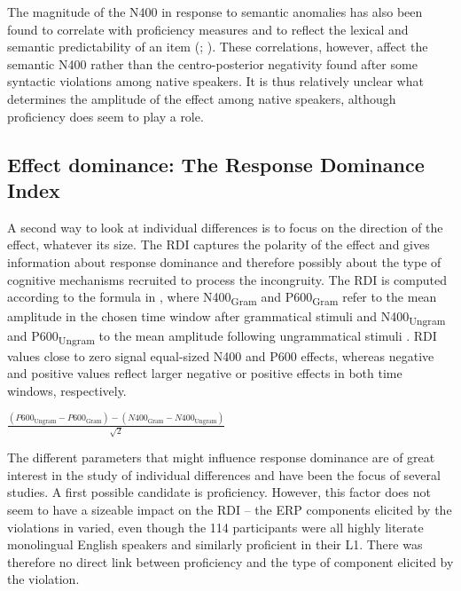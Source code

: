 \documentclass[output=paper,colorlinks,citecolor=brown,modfonts,nonflat]{../langscibook}
\begin{document}
The magnitude of the N400 in response to semantic anomalies has also been found to correlate with proficiency measures \citep{NewmanEtAl2012} and to reflect the lexical and semantic predictability of an item (\citealt{FedermeierKutas1999}; \citealt{DeLongEtAl2005,Federmeier2007}). These correlations, however, affect the semantic N400 rather than the centro-posterior negativity found after some syntactic violations among native speakers. It is thus relatively unclear what determines the amplitude of the effect among native speakers, although proficiency does seem to play a role.

\subsection{Effect dominance: The Response Dominance Index}


A second way to look at individual differences is to focus on the direction of the effect, whatever its size. The RDI captures the polarity of the effect and gives information about response dominance and therefore possibly about the type of cognitive mechanisms recruited to process the incongruity. The RDI is computed according to the formula in , where N400\textsubscript{Gram} and P600\textsubscript{Gram} refer to the mean amplitude in the chosen time window after grammatical stimuli and N400\textsubscript{Ungram} and P600\textsubscript{Ungram} to the mean amplitude following ungrammatical stimuli \citep{TannerEtAl2014}. RDI values close to zero signal equal-sized N400 and P600 effects, whereas negative and positive values reflect larger negative or positive effects in both time windows, respectively. \label{bkm:Ref4495949}

\ea
$\frac{\left(P600_{{\text{Ungram}}}-P600_{{\text{Gram}}}\right)-\left(N400_{{\text{Gram}}}-N400_{{\text{Ungram}}}\right)}{\sqrt 2}$
\z

The different parameters that might influence response dominance are of great interest in the study of individual differences and have been the focus of several studies. A first possible candidate is proficiency. However, this factor does not seem to have a sizeable impact on the RDI – the ERP components elicited by the violations in \citet{Tanner2019} varied, even though the 114 participants were all highly literate monolingual English speakers and similarly proficient in their L1. There was therefore no direct link between proficiency and the type of component elicited by the violation. 
\end{document}

